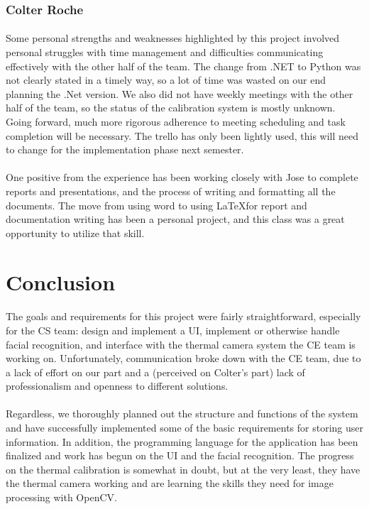 \documentclass[12pt, letterpaper]{article}
\begin{document}
    \subsubsection{Colter Roche}
    \paragraph{}
    Some personal strengths and weaknesses highlighted by this project involved personal 
    struggles with time management and difficulties communicating effectively with the other 
    half of the team.  The change from .NET to Python was not clearly stated in a timely way, 
    so a lot of time was wasted on our end planning the .Net version.  We also did not have 
    weekly meetings with the other half of the team, so the status of the calibration system is 
    mostly unknown.  Going forward, much more rigorous adherence to meeting scheduling and task 
    completion will be necessary.  The trello has only been lightly used, this will need to 
    change for the implementation phase next semester.  
    \paragraph{}
    One positive from the experience has been working closely with Jose to complete reports and 
    presentations, and the process of writing and formatting all the documents.  The move from 
    using word to using \LaTeX for report and documentation writing has been a personal project, 
    and this class was a great opportunity to utilize that skill.
    \section{Conclusion}
    \paragraph{}
    The goals and requirements for this project were fairly straightforward, especially for the 
    CS team: design and implement a UI, implement or otherwise handle facial recognition, and 
    interface with the thermal camera system the CE team is working on.  Unfortunately, 
    communication broke down with the CE team, due to a lack of effort on our part and a 
    (perceived on Colter’s part) lack of professionalism and openness to different solutions.  
    \paragraph{}
    Regardless, we thoroughly planned out the structure and functions of the system and have 
    successfully implemented some of the basic requirements for storing user information.  
    In addition, the programming language for the application has been finalized and work has 
    begun on the UI and the facial recognition.  The progress on the thermal calibration is 
    somewhat in doubt, but at the very least, they have the thermal camera working and are 
    learning the skills they need for image processing with OpenCV.
\end{document}
